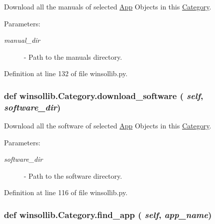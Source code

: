 Download all the manuals of selected \hyperlink{classwinsollib_1_1App}{App} Objects in this \hyperlink{classwinsollib_1_1Category}{Category}. 

\begin{Desc}
\item[Parameters:]
\begin{description}
\item[{\em manual\_\-dir}]- Path to the manuals directory. \end{description}
\end{Desc}


Definition at line 132 of file winsollib.py.\hypertarget{classwinsollib_1_1Category_79faeb2396e62dd2b0a438cc980eea26}{
\subsubsection[download\_\-software]{\setlength{\rightskip}{0pt plus 5cm}def winsollib.Category.download\_\-software ( {\em self},  {\em software\_\-dir})}}
\label{classwinsollib_1_1Category_79faeb2396e62dd2b0a438cc980eea26}


Download all the software of selected \hyperlink{classwinsollib_1_1App}{App} Objects in this \hyperlink{classwinsollib_1_1Category}{Category}. 

\begin{Desc}
\item[Parameters:]
\begin{description}
\item[{\em software\_\-dir}]- Path to the software directory. \end{description}
\end{Desc}


Definition at line 116 of file winsollib.py.\hypertarget{classwinsollib_1_1Category_27cf4c87fcebe53192063f504b20bd21}{
\subsubsection[find\_\-app]{\setlength{\rightskip}{0pt plus 5cm}def winsollib.Category.find\_\-app ( {\em self},  {\em app\_\-name})}}
\label{classwinsollib_1_1Category_27cf4c87fcebe53192063f504b20bd21}


